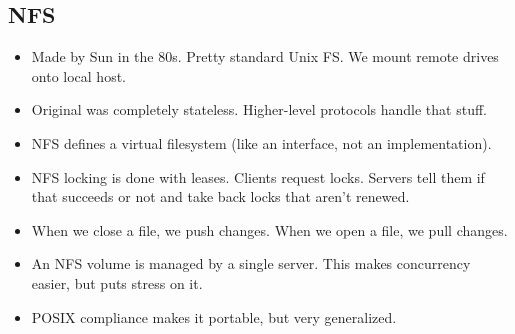 \documentclass{scrartcl}
\begin{document}
\subsection*{NFS}
\begin{itemize}
\item Made by Sun in the 80s. Pretty standard Unix FS. We mount remote drives
	onto local host.
\item Original was completely stateless. Higher-level protocols handle that stuff.
\item NFS defines a virtual filesystem (like an interface, not an implementation).
\item NFS locking is done with leases. Clients request locks. Servers tell them
	if that succeeds or not and take back locks that aren't renewed.
\item When we close a file, we push changes. When we open a file, we pull changes.
\item An NFS volume is managed by a single server. This makes concurrency easier,
	but puts stress on it.
\item POSIX compliance makes it portable, but very generalized.
\end{itemize}
\end{document}
